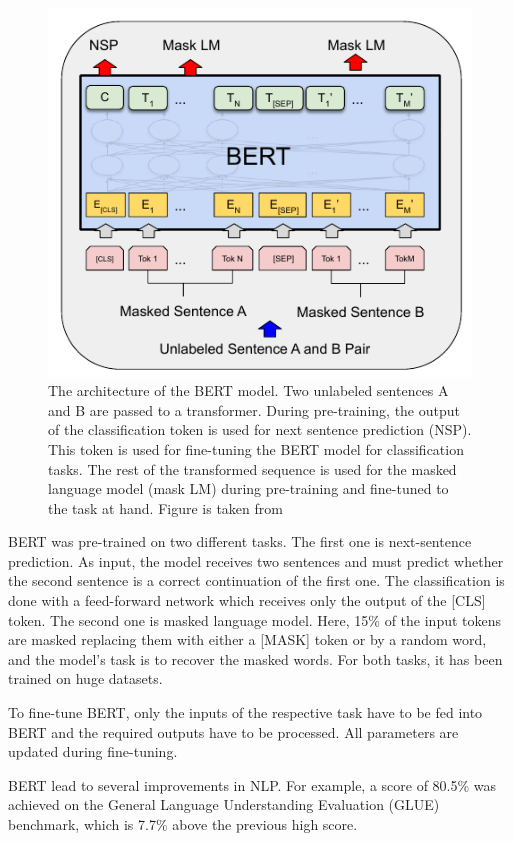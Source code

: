 \documentclass[a4paper]{scrartcl}
\begin{document}
    \begin{figure}[btp]
        \centering
        \includegraphics[width=0.5\linewidth]{img/BertArchitecture}
        \caption[BERT Archtitecture]{The architecture of the BERT model. Two unlabeled sentences A and B are passed to a transformer.
        During pre-training, the output of the classification token is used for next sentence prediction (NSP).
        This token is used for fine-tuning the BERT model for classification tasks.
        The rest of the transformed sequence is used for the masked language model (mask LM) during pre-training and fine-tuned to the task at hand.
        Figure is taken from~\cite{devlin2019bert}}
        \label{fig:bertArchitecture}
    \end{figure}

    BERT was pre-trained on two different tasks.
    The first one is next-sentence prediction.
    As input, the model receives two sentences and must predict whether the second sentence is a correct continuation of the first one.
    The classification is done with a feed-forward network which receives only the output of the [CLS] token.
    The second one is masked language model.
    Here, 15\% of the input tokens are masked replacing them with either a [MASK] token or by a random word, and the model's task is to recover the masked words.
    For both tasks, it has been trained on huge datasets.

    To fine-tune BERT, only the inputs of the respective task have to be fed into BERT and the required outputs have to be processed.
    All parameters are updated during fine-tuning.

    BERT lead to several improvements in NLP\@.
    For example, a score of 80.5\% was achieved on the General Language Understanding Evaluation (GLUE) benchmark, which is 7.7\% above the previous high score.
\end{document}
